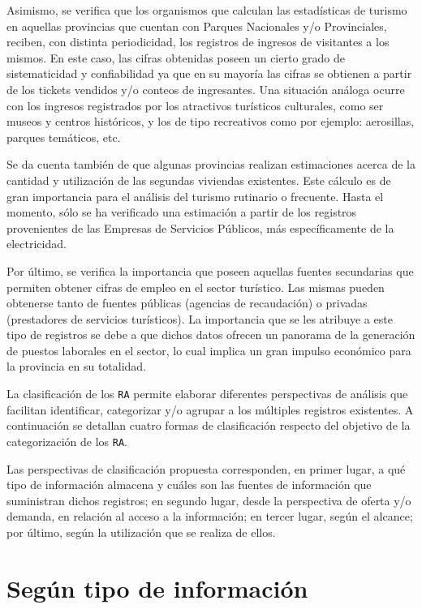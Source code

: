 \documentclass[
]{book}
\begin{document}
Asimismo, se verifica que los organismos que calculan las estadísticas de turismo en aquellas provincias que cuentan con Parques Nacionales y/o Provinciales, reciben, con distinta periodicidad, los registros de ingresos de visitantes a los mismos. En este caso, las cifras obtenidas poseen un cierto grado de sistematicidad y confiabilidad ya que en su mayoría las cifras se obtienen a partir de los tickets vendidos y/o conteos de ingresantes. Una situación análoga ocurre con los ingresos registrados por los atractivos turísticos culturales, como ser museos y centros históricos, y los de tipo recreativos como por ejemplo: aerosillas, parques temáticos, etc.

Se da cuenta también de que algunas provincias realizan estimaciones acerca de la cantidad y utilización de las segundas viviendas existentes. Este cálculo es de gran importancia para el análisis del turismo rutinario o frecuente. Hasta el momento, sólo se ha verificado una estimación a partir de los registros provenientes de las Empresas de Servicios Públicos, más específicamente de la electricidad.

Por último, se verifica la importancia que poseen aquellas fuentes secundarias que permiten obtener cifras de empleo en el sector turístico. Las mismas pueden obtenerse tanto de fuentes públicas (agencias de recaudación) o privadas (prestadores de servicios turísticos). La importancia que se les atribuye a este tipo de registros se debe a que dichos datos ofrecen un panorama de la generación de puestos laborales en el sector, lo cual implica un gran impulso económico para la provincia en su totalidad.

La clasificación de los \texttt{RA} permite elaborar diferentes perspectivas de análisis que facilitan identificar, categorizar y/o agrupar a los múltiples registros existentes. A continuación se detallan cuatro formas de clasificación respecto del objetivo de la categorización de los \texttt{RA}.

Las perspectivas de clasificación propuesta corresponden, en primer lugar, a qué tipo de información almacena y cuáles son las fuentes de información que suministran dichos registros; en segundo lugar, desde la perspectiva de oferta y/o demanda, en relación al acceso a la información; en tercer lugar, según el alcance; por último, según la utilización que se realiza de ellos.

\hypertarget{seguxfan-tipo-de-informaciuxf3n}{%
\section{Según tipo de información}\label{seguxfan-tipo-de-informaciuxf3n}}
\end{document}
